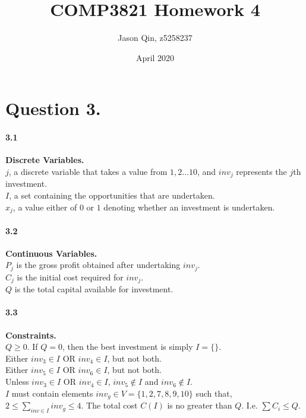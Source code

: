 \documentclass{article}
\title{COMP3821 Homework 4}
\author{Jason Qin, z5258237}
\date{April 2020}
\begin{document}
\maketitle

\section*{Question 3.}
\paragraph*{3.1} \textbf{Discrete Variables.} \\

\noindent
$j$, a discrete variable that takes a value from $1,2...10$, and $inv_j$ represents the $j$th investment. \\
$I$, a set containing the opportunities that are undertaken. \\
$x_j$, a value either of $0$ or $1$ denoting whether an investment is undertaken.

\paragraph*{3.2} \textbf{Continuous Variables.} \\

\noindent
$P_j$ is the gross profit obtained after undertaking $inv_j$. \\
$C_j$ is the initial cost required for $inv_j$. \\
$Q$ is the total capital available for investment.

\paragraph*{3.3} \textbf{Constraints.} \\

\noindent
$Q \geq 0$. If $Q = 0$, then the best investment is simply $I = \{\}$. \\
Either $inv_3 \in I$ OR $inv_4 \in I$, but not both. \\
Either $inv_5 \in I$ OR $inv_6 \in I$, but not both. \\
Unless $inv_3 \in I$ OR $inv_4 \in I$, $inv_5 \notin I$ and $inv_6 \notin I$. \\
$I$ must contain elements $inv_g \in V = \{1,2,7,8,9,10\}$ such that, $2 \leq \sum_{inv \in I} inv_g \leq 4$.
The total cost $C(I)$ is no greater than $Q$. I.e. $\sum C_i \leq Q$.
\end{document}
